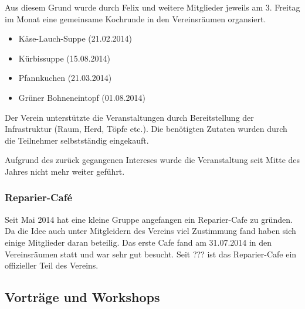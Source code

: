 \documentclass[10pt,DIV16]{scrartcl}
\begin{document}
Aus diesem Grund wurde durch Felix und weitere Mitglieder jeweils am 3. Freitag
im Monat eine gemeinsame Kochrunde in den Vereinsräumen organsiert.

\begin{itemize}
    \item Käse-Lauch-Suppe (21.02.2014)
    \item Kürbissuppe (15.08.2014)
    \item Pfannkuchen (21.03.2014)
    \item Grüner Bohneneintopf (01.08.2014)
\end{itemize}

Der Verein unterstützte die Veranstaltungen durch Bereitstellung der
Infrastruktur (Raum, Herd, Töpfe etc.). Die benötigten Zutaten wurden
durch die Teilnehmer selbstständig eingekauft. 

Aufgrund des zurück gegangenen Intereses wurde die Veranstaltung seit Mitte des Jahres nicht mehr weiter geführt. 

\subsubsection{Reparier-Café}

Seit Mai 2014 hat eine kleine Gruppe angefangen ein Reparier-Cafe zu gründen. 
Da die Idee auch unter Mitgleidern des Vereins viel Zustimmung fand haben sich einige Mitglieder daran beteilig. 
Das erste Cafe fand am 31.07.2014 in den Vereinsräumen statt und war sehr gut besucht. 
Seit ??? ist das Reparier-Cafe ein offizieller Teil des Vereins. 


\subsection{Vorträge und Workshops}
\end{document}
